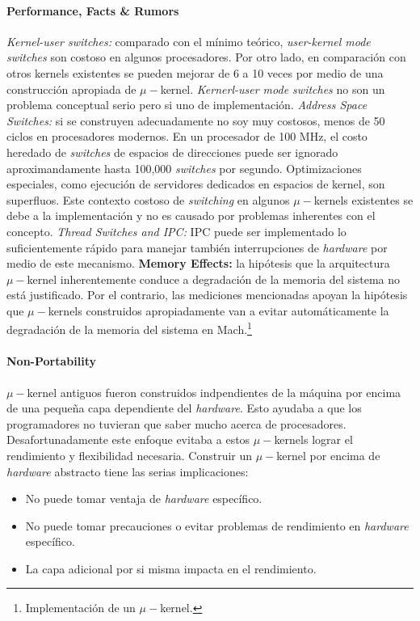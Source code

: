 \paragraph{\textnormal{\textbf{Performance, Facts \& Rumors}}}
\textit{Kernel-user switches:} comparado con el mínimo teórico, \textit{user-kernel mode switches} son costoso en algunos procesadores. Por otro lado, en comparación con otros kernels existentes se pueden mejorar de 6 a 10 veces por medio de una construcción apropiada de $\mu-$kernel. \textit{Kernerl-user mode switches} no son un problema conceptual serio pero si uno de implementación. \textit{Address Space Switches:} si se construyen adecuadamente no soy muy costosos, menos de 50 ciclos en procesadores modernos. En un procesador de 100 MHz, el costo heredado de \textit{switches} de espacios de direcciones puede ser ignorado aproximandamente hasta 100,000 \textit{switches} por segundo. Optimizaciones especiales, como ejecución de servidores dedicados en espacios de kernel, son superfluos. Este contexto costoso de \textit{switching} en algunos $\mu-$kernels existentes se debe a la implementación y no es causado por problemas inherentes con el concepto. \textit{Thread Switches and IPC:} IPC puede ser implementado lo suficientemente rápido para manejar también interrupciones de \textit{hardware} por medio de este mecanismo. \textbf{Memory Effects:} la hipótesis que la arquitectura $\mu-$kernel inherentemente conduce a degradación de la memoria del sistema no está justificado. Por el contrario, las mediciones mencionadas apoyan la hipótesis que $\mu-$kernels construidos apropiadamente van a evitar automáticamente la degradación de la memoria del sistema en Mach.\footnote{Implementación de un $\mu-$kernel.}

\paragraph{\textnormal{\textbf{Non-Portability}}}
$\mu-$kernel antiguos fueron construidos indpendientes de la máquina por encima de una pequeña capa dependiente del \textit{hardware}. Esto ayudaba a que los programadores no tuvieran que saber mucho acerca de procesadores. Desafortunadamente este enfoque evitaba a estos $\mu-$kernels lograr el rendimiento y flexibilidad necesaria. Construir un $\mu-$kernel por encima de \textit{hardware} abstracto tiene las serias implicaciones:
\begin{itemize}
    \item No puede tomar ventaja de \textit{hardware} específico.
    \item No puede tomar precauciones o evitar problemas de rendimiento en \textit{hardware} específico.
    \item La capa adicional por si misma impacta en el rendimiento.
\end{itemize}

